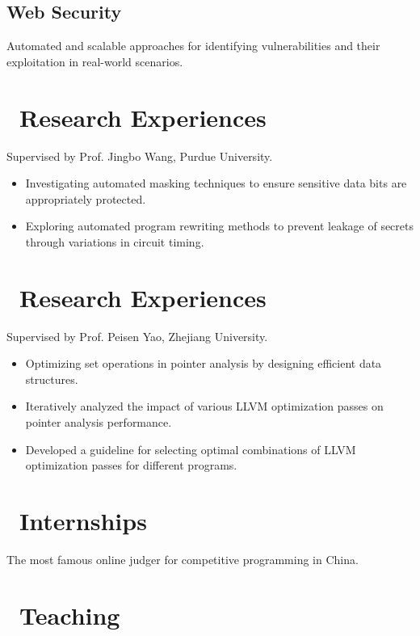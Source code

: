 \documentclass{resume}
\begin{document}
\subsection{\textbf{Web Security}}
Automated and scalable approaches for identifying vulnerabilities and their exploitation in real-world scenarios.

\section{\faSearch\ Research Experiences}
Supervised by Prof. Jingbo Wang, Purdue University.  
\begin{itemize}  
  \item Investigating automated masking techniques to ensure sensitive data bits are appropriately protected.  
  \item Exploring automated program rewriting methods to prevent leakage of secrets through variations in circuit timing.  
\end{itemize}

\section{\faSearch\ Research Experiences}  
Supervised by Prof. Peisen Yao, Zhejiang University.  
\begin{itemize}  
  \item Optimizing set operations in pointer analysis by designing efficient data structures.  
  \item Iteratively analyzed the impact of various LLVM optimization passes on pointer analysis performance.  
  \item Developed a guideline for selecting optimal combinations of LLVM optimization passes for different programs.  
\end{itemize}

\section{\faUsers\ Internships}
The most famous online judger for competitive programming in China.

\section{\faBook\ Teaching}
\end{document}
